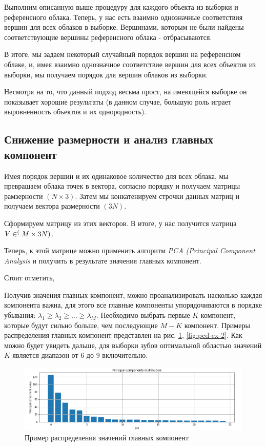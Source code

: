 Выполним описанную выше процедуру для каждого объекта из выборки и референсного облака. Теперь, у нас есть взаимно однозначные соответствия вершин для всех облаков в выборке. Вершинами, которым не были найдены соответствующие вершины референсного облака - отбрасываются.

В итоге, мы задаем некоторый случайный порядок вершин на референсном облаке, и, имея взаимно однозначное соответствие вершин для всех объектов из выборки, мы получаем порядок для вершин облаков из выборки.

Несмотря на то, что данный подход весьма прост, на имеющейся выборке он показывает хорошие результаты (в данном случае, большую роль играет выровненность объектов и их однородность).


\subsection{Снижение размерности и анализ главных компонент}

Имея порядок вершин и их одинаковое количество для всех облака, мы превращаем облака точек в вектора, согласно порядку и получаем матрицы рамзерности $(N \times 3)$. Затем мы конкатенируем строчки данных матриц и получаем вектора размерности $(3N)$.

Сформируем матрицу из этих векторов. В итоге, у нас получится матрица $V \in \real^(M \times 3N)$.

Теперь, к этой матрице можно применить алгоритм \textit{PCA (Principal Component Analysis} \cite{bishop} и получить в результате значения главных компонент.

Стоит отметить, %


Получив значения главных компонент, можно проанализировать насколько каждая компонента важна, для этого все главные компоненты упорядочиваются в порядке убывания: $\lambda_{1} \ge \lambda_{2} \ge \dots \ge \lambda_{M}$.
Необходимо выбрать первые $K$ компонент, которые будут сильно больше, чем последующие $M - K$ компонент. Примеры распределения главных компонент представлен на рис. \ref{fig:pcd-ex-1}, \ref{fig:pcd-ex-2}. Как можно будет увидеть дальше, для выборки зубов 
оптимальной областью значений $K$ является диапазон от 6 до 9 включительно.

\begin{figure}[ht!]
    \includegraphics[width=1\linewidth]{images/pcd-example-1.png}
	\caption{Пример распределения значений главных компонент}
    \label{fig:pcd-ex-1}
\end{figure}

